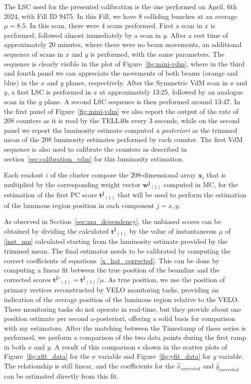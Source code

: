 The LSC used for the presented calibration is the one performed on April, 6th 2024, with Fill ID 9475. In this Fill, we have 8 colliding bunches at an average $\mu=8.5$. In this scan, there were 4 scans performed. First a scan in $x$ is performed, followed almost immediately by a scan in $y$. After a rest time of approximately 20 minutes, where there were no beam movements, an additional sequence of scans in $x$ and $y$ is performed, with the same parameters. The sequence is clearly visible in the plot of Figure~\ref{fig:mini-vdm}, where in the third and fourth panel we can appreciate the movements of both beams (orange and blue) in the $x$ and $y$ planes, respectively. After the Symmetric VdM scan in $x$ and $y$, a first LSC is performed in $x$ at approximately 13:25, followed by an analogue scan in the $y$ plane. A second LSC sequence is then performed around 13:47. In the first panel of Figure~\ref{fig:mini-vdm} we also report the output of the rate of 208 counters as it is read by the TELL40s every 3 seconds, while on the second panel we report the luminosity estimate computed \textit{a posteriori} as the trimmed mean of the 208 luminosity estimates performed by each counter. The first VdM sequence is also used to calibrate the counters as described in section~\ref{sec:calibration_vdm} for this luminosity estimation. 

Each readout $i$ of the cluster compose the 208-dimensional array $\mathbf{x}_i$ that is multiplied by the corresponding weight vector $\mathbf{w^j}_{(1)}$ computed in MC, for the estimation of the first PC score $\mathbf{t^j}_{(1)}$ that will be used to perform the estimation of the luminous region position in each component $j=x,y$. 

As observed in Section~\ref{sec:mu_dependency}, the unbiased scores can be obtained by dividing the calculated $\mathbf{t^j}_{(1)}$ by the value of instantaneous $\mu$ of \eqref{inst_mu} calculated starting from the luminosity estimate provided by the trimmed mean.
The final estimator needs to be calibrated by computing the correct coefficients of equations~\ref{x_hat_corrected}. This can be done by computing a linear fit between the true position of the beamline and the corrected scores $\mathbf{t^j}'_{(1)}=\mathbf{t^j}_{(1)}/\mu$. As true position, we use the position of primary vertices reconstructed by VELO monitoring tasks, providing an indication of the average position of the luminous region relative to the VELO. These monitoring tasks do not operate in real-time, but they provide about one position estimate per second a-posteriori, offering a solid basis for comparison with my estimators. After the matching between the Timestamp of these series is performed, we perform a comparison of the two data points during the first ramp in both $x$ and $y$. A result of this comparison s shown in the scatter plots of Figure~\ref{fig:xfit_data} for the $x$ variable and Figure~\ref{fig:yfit_data} for $y$ variable. The relationship is still linear, and the coefficients for the $\hat{x}_{corrected}$ and $\hat{y}_{corrected}$ can be estimated directly from this fit.


